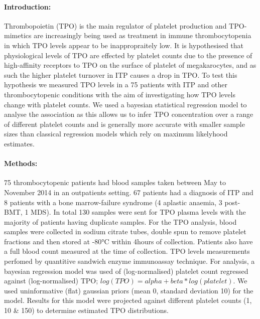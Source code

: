 \documentclass[11pt]{article}
\title{}
\author{George Adams .... Nichola Cooper}
\date{July 2018}
\begin{document}
\maketitle

\paragraph{Introduction:} Thrombopoietin (TPO) is the main regulator of platelet production and TPO-mimetics are increasingly being used as treatment in immune thrombocytopenia in which TPO levels appear to be inappropraitely low. It is hypothesised that physiological levels of TPO are effected by platelet counts due to the presence of high-affinity receptors to TPO on the surface of platelet of megakarocytes, and as such the higher platelet turnover in ITP causes a drop in TPO. To test this hypothesis we measured TPO levels in a 75 patients with ITP and other thrombocytopenic conditions with the aim of investigating how TPO levels change with platelet counts. We used a bayesian statistical regression model to analyse the association as this allows us to infer TPO concentration over a range of different platelet counts and is generally more accurate with smaller sample sizes than classical regression models which rely on maximum likelyhood estimates.


\paragraph{Methods:} 75 thrombocytopenic patients had blood samples taken between May to November 2014 in an outpatients setting. 67 patients had a diagnosis of ITP and 8 patients with a bone marrow-failure syndrome (4 aplastic anaemia, 3 post- BMT, 1 MDS). In total 130 samples were sent for TPO plasma levels with the majority of patients having duplicate samples. For the TPO analysis, blood samples were collected in sodium citrate tubes, double spun to remove platelet fractions and then stored at -80°C within 4hours of collection. Patients also have a full blood count measured at the time of collection. TPO levels measurements perfomed by quantitive sandwich enzyme immunoassay technique. For analysis, a bayesian regression model was used of (log-normalised) platelet count regressed against (log-normalised) TPO; $log(TPO) = alpha + beta*log(platelet)$. We used uninformative (flat) gaussian priors (mean 0, standard deviation 10) for the model. Results for this model were projected against different platelet counts (1, 10 & 150) to determine estimated TPO distributions.
\end{document}
